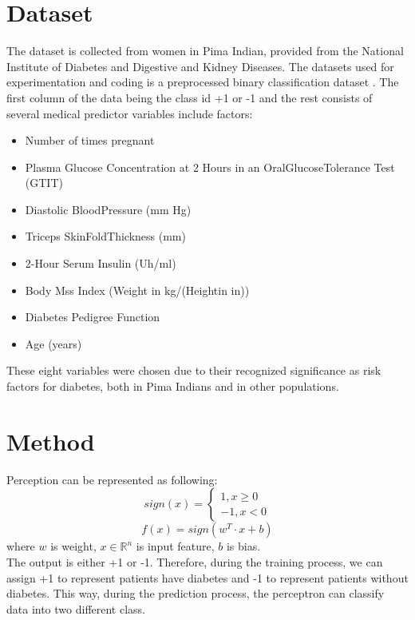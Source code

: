 \documentclass[10pt,twocolumn,letterpaper]{article}
\begin{document}
\section{Dataset}
The dataset is collected from women in Pima Indian, provided from the National Institute of Diabetes and Digestive and Kidney Diseases. The datasets used for experimentation and coding is a preprocessed binary classification dataset . The first column of the data being the class id +1 or -1 and the rest consists of several medical predictor variables include factors:
\begin{itemize}
\item Number of times pregnant
\item Plasma Glucose Concentration at 2 Hours in an OralGlucoseTolerance Test (GTIT)
\item Diastolic BloodPressure (mm Hg)
\item Triceps SkinFoldThickness (mm)
\item 2-Hour Serum Insulin (Uh/ml)
\item Body Mss Index (Weight in kg/(Heightin in))
\item Diabetes Pedigree Function
\item Age (years)
\end{itemize}\leavevmode
These eight\cite{smith1988using} variables were chosen due to their recognized significance as risk factors for diabetes, both in Pima Indians and in other populations.

\section{Method}
Perception can be represented as following:
\begin{equation}
  sign(x) = \begin{cases}
    1, x\geq 0 \\
    -1, x<0
  \end{cases}
\end{equation}
\begin{equation}
  f(x)=sign(w^T\cdot x + b)
\end{equation}
where $w$ is weight, $x \in \mathbb{R}^n$ is input feature, $b$ is bias.\\
\indent The output is either +1 or -1. Therefore, during the training process, we can assign +1 to represent patients have diabetes and -1 to represent patients without diabetes. This way, during the prediction process, the perceptron can classify data into two different class.
\end{document}
